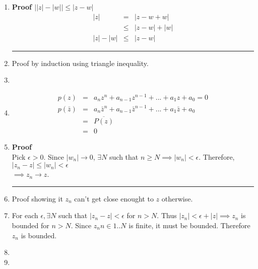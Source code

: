 \documentclass{article}%
\newcommand\abs[1]{\left|#1\right|}
\newenvironment{proof}[1][]{\begin{samepage}\textbf{Proof #1} }{\rule{0.5em}{0.5em} \end{samepage}}
\begin{document}
\begin{enumerate}
\begin{enumerate}[label*=\arabic*.]
\begin{proof}[$\abs{z+w}\leq\abs{z}+\abs{w}$]
\begin{eqnarray*}
                \implies \\
                \abs{z+w} &\leq& \abs{z}+\abs{w}
            \end{eqnarray*}
        \end{proof}
        \item %
        \begin{proof}[$\abs{\abs{z}-\abs{w}}\leq\abs{z-w}$]
            \begin{eqnarray*}
                \abs{z} &=& \abs{z - w + w} \\
                        &\leq& \abs{z-w} +\abs{w} \\
                \abs{z}-\abs{w} &\leq& \abs{z-w}
            \end{eqnarray*}
        \end{proof}
        \item %
            Proof by induction using triangle inequality.
        \item %
        \item %
        \begin{eqnarray*}
            p(z) &=& a_n z^n + a_{n-1} z^{n-1} + ... + a_1 z+ a_0 = 0 \\
            p(\bar{z}) &=& a_n \bar{z}^n + a_{n-1} \bar{z}^{n-1} + ... + a_1 \bar{z}+ a_0 \\ 
                       &=& \overline{P(z)} \\
                       &=& 0 
        \end{eqnarray*}
        \item %
        \begin{proof} 
            \\
            Pick $\epsilon > 0$. Since $\abs{w_n} \to 0$, $\exists N$ such that $n\geq N \implies \abs{w_n}< \epsilon$. Therefore, $\abs{z_n - z} \leq \abs{w_n} < \epsilon$ \\
            $\implies z_n \to z$.\\
        \end{proof}
        \item %
        Proof showing it $z_n$ can't get close enought to $z$ otherwise.
        \item %
        For each $\epsilon, \exists N$ such that $\abs{z_n - z} < \epsilon$ for $n>N$. Thus $\abs{z_n} < \epsilon + \abs{z} \implies z_n$ is bounded for $n>N$.
        Since $z_n n\in1..N$ is finite, it must be bounded. Therefore $z_n$ is  bounded.
        \item %
        \item %

\end{enumerate}
\end{enumerate}
\end{document}

